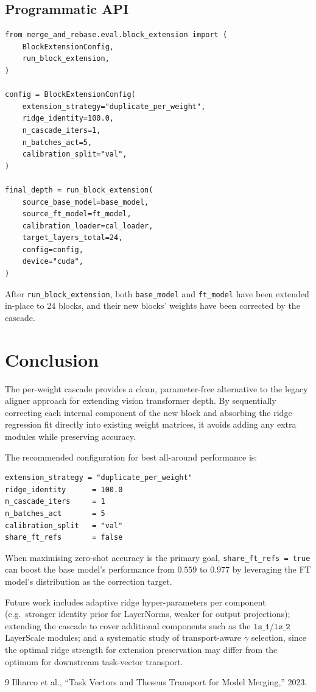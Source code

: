 \documentclass[11pt,a4paper]{article}
\begin{document}
\subsection{Programmatic API}

\begin{lstlisting}
from merge_and_rebase.eval.block_extension import (
    BlockExtensionConfig,
    run_block_extension,
)

config = BlockExtensionConfig(
    extension_strategy="duplicate_per_weight",
    ridge_identity=100.0,
    n_cascade_iters=1,
    n_batches_act=5,
    calibration_split="val",
)

final_depth = run_block_extension(
    source_base_model=base_model,
    source_ft_model=ft_model,
    calibration_loader=cal_loader,
    target_layers_total=24,
    config=config,
    device="cuda",
)
\end{lstlisting}

After \texttt{run\_block\_extension}, both \texttt{base\_model} and
\texttt{ft\_model} have been extended in-place to 24 blocks, and their
new blocks' weights have been corrected by the cascade.

\section{Conclusion}
\label{sec:conclusion}

The per-weight cascade provides a clean, parameter-free alternative to the
legacy aligner approach for extending vision transformer depth. By
sequentially correcting each internal component of the new block and
absorbing the ridge regression fit directly into existing weight matrices,
it avoids adding any extra modules while preserving accuracy.

The recommended configuration for best all-around performance is:

\begin{lstlisting}
extension_strategy = "duplicate_per_weight"
ridge_identity      = 100.0
n_cascade_iters     = 1
n_batches_act       = 5
calibration_split   = "val"
share_ft_refs       = false
\end{lstlisting}

When maximising zero-shot accuracy is the primary goal,
\texttt{share\_ft\_refs = true} can boost the base model's performance from
$0.559$ to $0.977$ by leveraging the FT model's distribution as the
correction target.

Future work includes adaptive ridge hyper-parameters per component
(e.g.\ stronger identity prior for LayerNorms, weaker for output projections);
extending the cascade to cover additional components such as the
$\texttt{ls\_1}$/$\texttt{ls\_2}$ LayerScale modules; and a systematic study
of transport-aware $\gamma$ selection, since the optimal ridge strength
for extension preservation may differ from the optimum for downstream
task-vector transport.

\begin{thebibliography}{9}
Ilharco et al., ``Task Vectors and Theseus Transport for Model Merging,''
2023.
\end{thebibliography}
\end{document}
